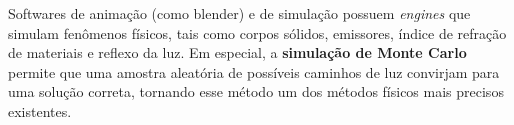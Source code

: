 Softwares de animação (como blender) e de simulação possuem \textit{engines} que simulam fenômenos físicos, tais como corpos sólidos, emissores, índice de refração de materiais e reflexo da luz. Em especial, a \textbf{simulação de Monte Carlo} permite que uma amostra aleatória de possíveis caminhos de luz convirjam para uma solução correta, tornando esse método um dos métodos físicos mais precisos existentes.

